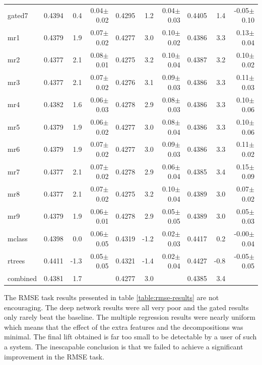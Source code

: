 \documentclass{article}
\begin{document}
\begin{table}[t]
\begin{center}
\begin{small}
\begin{sc}
\begin{tabular}{l|rr r|rr r|rr r}
gated7     & 0.4394 &   0.4 &  0.04$\pm$0.02& 0.4295 &   1.2 &  0.04$\pm$0.03& 0.4405 &   1.4 & -0.05$\pm$0.10 \\ 
\abovespace
mr1        & 0.4379 &   1.9 &  0.07$\pm$0.02& 0.4277 &   3.0 &  0.10$\pm$0.02& 0.4386 &   3.3 &  0.13$\pm$0.04 \\ 
mr2        & 0.4377 &   2.1 &  0.08$\pm$0.01& 0.4275 &   3.2 &  0.10$\pm$0.04& 0.4387 &   3.2 &  0.10$\pm$0.02 \\ 
mr3        & 0.4377 &   2.1 &  0.07$\pm$0.02& 0.4276 &   3.1 &  0.09$\pm$0.03& 0.4386 &   3.3 &  0.11$\pm$0.03 \\ 
mr4        & 0.4382 &   1.6 &  0.06$\pm$0.03& 0.4278 &   2.9 &  0.08$\pm$0.03& 0.4386 &   3.3 &  0.10$\pm$0.06 \\ 
mr5        & 0.4379 &   1.9 &  0.06$\pm$0.02& 0.4277 &   3.0 &  0.08$\pm$0.04& 0.4386 &   3.3 &  0.10$\pm$0.06 \\ 
mr6        & 0.4379 &   1.9 &  0.07$\pm$0.02& 0.4277 &   3.0 &  0.09$\pm$0.03& 0.4386 &   3.3 &  0.11$\pm$0.02 \\ 
mr7        & 0.4377 &   2.1 &  0.07$\pm$0.02& 0.4278 &   2.9 &  0.06$\pm$0.04& 0.4385 &   3.4 &  0.15$\pm$0.09 \\ 
mr8        & 0.4377 &   2.1 &  0.07$\pm$0.02& 0.4275 &   3.2 &  0.10$\pm$0.04& 0.4389 &   3.0 &  0.07$\pm$0.02 \\ 
mr9        & 0.4379 &   1.9 &  0.06$\pm$0.01& 0.4278 &   2.9 &  0.05$\pm$0.05& 0.4389 &   3.0 &  0.05$\pm$0.03 \\ 
\abovespace
mclass     & 0.4398 &   0.0 &  0.06$\pm$0.05& 0.4319 &  -1.2 &  0.02$\pm$0.03& 0.4417 &   0.2 & -0.00$\pm$0.04 \\ 
rtrees     & 0.4411 &  -1.3 &  0.05$\pm$0.05& 0.4321 &  -1.4 &  0.02$\pm$0.04& 0.4427 &  -0.8 & -0.05$\pm$0.05 \\ 
\abovespace\belowspace
combined   & 0.4381 &   1.7 &  & 0.4277 &   3.0 &  & 0.4385 &   3.4 &   \\ 
\hline
\end{tabular}
\end{sc}
\end{small}
\end{center}
\vskip -0.1in
\end{table}

The RMSE task results presented in table \ref{table:rmse-results} are not encouraging.  The deep network results were all very poor and the gated results only rarely beat the baseline.  The multiple regression results were nearly uniform which means that the effect of the extra features and the decompositions was minimal.  The final lift obtained is far too small to be detectable by a user of such a system.  The inescapable conclusion is that we failed to achieve a significant improvement in the RMSE task.
\end{document}
